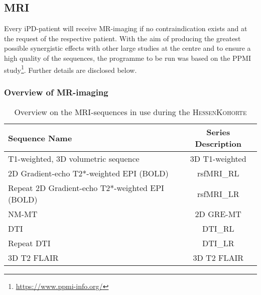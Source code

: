 \subsection{\ac{MRI}}
Every \ac{iPD}-patient will receive MR-imaging if no contraindication exists and at the request of the respective patient. With the aim of producing the greatest possible synergistic effects with other large studies at the centre and to ensure a high quality of the sequences, the programme to be run was based on the PPMI study\footnote{\url{https://www.ppmi-info.org/}}. Further details are disclosed below.

\subsubsection{Overview of MR-imaging}

\begin{table}[h]
\caption[Overview of MRI sequences]{Overview on the \ac{MRI}-sequences in use during the \textsc{HessenKohorte}}
\small
\begin{tabularx}{1\textwidth}{@{}X *{1}{C}@{}}
\toprule
\textbf{Sequence Name} 						& \textbf{Series Description }	\\
\midrule
T1-weighted, 3D volumetric sequence 			& 3D T1-weighted 		\\
2D Gradient-echo T2*-weighted EPI (BOLD) 		& rsfMRI\_RL 			\\
Repeat 2D Gradient-echo T2*-weighted EPI (BOLD) 	& rsfMRI\_LR 			\\
NM-MT 										& 2D GRE-MT 			\\
DTI 											& DTI\_RL 			\\
Repeat DTI 									& DTI\_LR 			\\
3D T2 FLAIR 									& 3D T2 FLAIR 		\\
\bottomrule
\end{tabularx}
\end{table}



